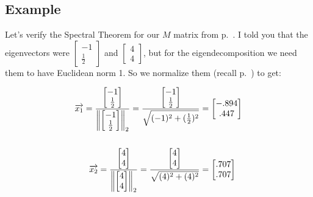 \subsection{Example}


Let's verify the Spectral Theorem for our $M$ matrix from p.~\pageref{mmatrix}.
I told you that the eigenvectors were {\footnotesize $\begin{bmatrix} -1 \\
\frac{1}{2} \end{bmatrix}$} and {\footnotesize $\begin{bmatrix} 4 \\ 4
\end{bmatrix}$}, but for the eigendecomposition we need them to have Euclidean
norm 1. So we normalize them (recall p.~\pageref{normalizing}) to get:


\vspace{-.15in}
\begin{align*}
\overrightarrow{x_1} =
\dfrac{\begin{bmatrix} -1 \\ \frac{1}{2} \end{bmatrix}}
{\left\lVert{\begin{bmatrix} -1 \\ \frac{1}{2} \end{bmatrix}}\right\rVert_2} =
\dfrac{\begin{bmatrix} -1 \\ \frac{1}{2} \end{bmatrix}}
{\sqrt{(-1)^2 + (\frac{1}{2})^2}} &=
\begin{bmatrix} -.894 \\ .447 \end{bmatrix}\\
\medskip\\
\overrightarrow{x_2} =
\dfrac{\begin{bmatrix} 4 \\ 4 \end{bmatrix}}
{\left\lVert{\begin{bmatrix} 4 \\ 4 \end{bmatrix}}\right\rVert_2} =
\dfrac{\begin{bmatrix} 4 \\ 4 \end{bmatrix}}
{\sqrt{(4)^2 + (4)^2}} &=
\begin{bmatrix} .707 \\ .707 \end{bmatrix}\\
\end{align*}
\vspace{-.25in}

